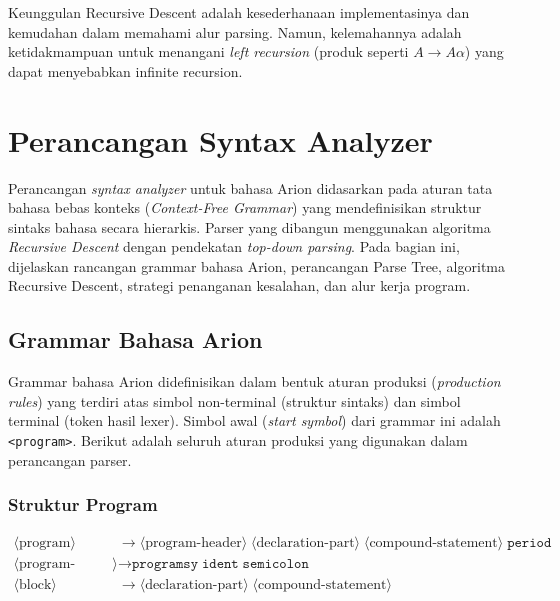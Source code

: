 \documentclass[12pt,a4paper]{article}
\begin{document}
Keunggulan Recursive Descent adalah kesederhanaan implementasinya dan kemudahan dalam memahami alur parsing. Namun, kelemahannya adalah ketidakmampuan untuk menangani \textit{left recursion} (produk seperti $A \rightarrow A \alpha$) yang dapat menyebabkan infinite recursion.

\section{Perancangan Syntax Analyzer}

Perancangan \textit{syntax analyzer} untuk bahasa Arion didasarkan pada aturan tata bahasa bebas konteks (\textit{Context-Free Grammar}) yang mendefinisikan struktur sintaks bahasa secara hierarkis. Parser yang dibangun menggunakan algoritma \textit{Recursive Descent} dengan pendekatan \textit{top-down parsing}. Pada bagian ini, dijelaskan rancangan grammar bahasa Arion, perancangan Parse Tree, algoritma Recursive Descent, strategi penanganan kesalahan, dan alur kerja program.

\subsection{Grammar Bahasa Arion}

Grammar bahasa Arion didefinisikan dalam bentuk aturan produksi (\textit{production rules}) yang terdiri atas simbol non-terminal (struktur sintaks) dan simbol terminal (token hasil lexer). Simbol awal (\textit{start symbol}) dari grammar ini adalah \texttt{<program>}. Berikut adalah seluruh aturan produksi yang digunakan dalam perancangan parser.

\subsubsection{Struktur Program}
\begin{align*}
\langle \text{program} \rangle &\rightarrow \langle \text{program-header} \rangle \; \langle \text{declaration-part} \rangle \; \langle \text{compound-statement} \rangle \; \texttt{period} \\
\langle \text{program-header} \rangle &\rightarrow \texttt{programsy} \; \texttt{ident} \; \texttt{semicolon} \\
\langle \text{block} \rangle &\rightarrow \langle \text{declaration-part} \rangle \; \langle \text{compound-statement} \rangle
\end{align*}
\end{document}
